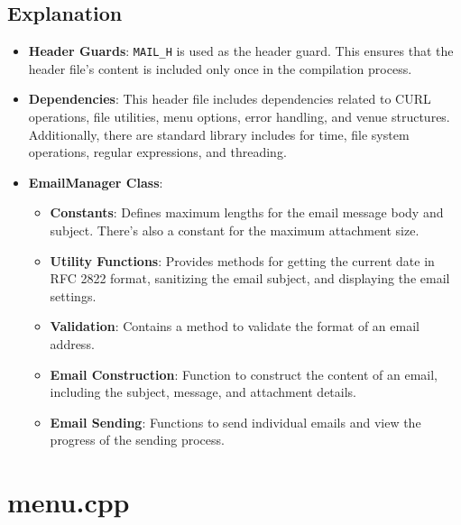 \documentclass{article}
\begin{document}
	\subsection*{Explanation}
	\begin{itemize}
		\item \textbf{Header Guards}: \texttt{MAIL\_H} is used as the header guard. This ensures that the header file's content is included only once in the compilation process.
		\item \textbf{Dependencies}: This header file includes dependencies related to CURL operations, file utilities, menu options, error handling, and venue structures. Additionally, there are standard library includes for time, file system operations, regular expressions, and threading.
		\item \textbf{EmailManager Class}: 
		\begin{itemize}
			\item \textbf{Constants}: Defines maximum lengths for the email message body and subject. There's also a constant for the maximum attachment size.
			\item \textbf{Utility Functions}: Provides methods for getting the current date in RFC 2822 format, sanitizing the email subject, and displaying the email settings.
			\item \textbf{Validation}: Contains a method to validate the format of an email address.
			\item \textbf{Email Construction}: Function to construct the content of an email, including the subject, message, and attachment details.
			\item \textbf{Email Sending}: Functions to send individual emails and view the progress of the sending process.
		\end{itemize}
	\end{itemize}
	
	\section{menu.cpp}
	
\end{document}
